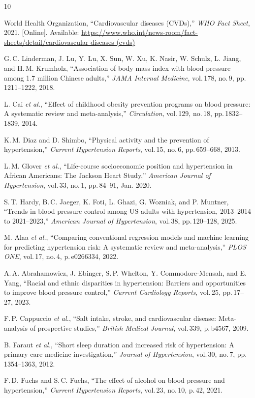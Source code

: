﻿\documentclass[conference]{IEEEtran}
\begin{document}
\begin{thebibliography}{10}

World Health Organization, ``Cardiovascular diseases (CVDs),'' \textit{WHO Fact Sheet}, 2021. [Online]. Available: \url{https://www.who.int/news-room/fact-sheets/detail/cardiovascular-diseases-(cvds)}

G.\,C. Linderman, J. Lu, Y. Lu, X. Sun, W. Xu, K. Nasir, W. Schulz, L. Jiang, and H.\,M. Krumholz, ``Association of body mass index with blood pressure among 1.7 million Chinese adults,'' \textit{JAMA Internal Medicine}, vol.\,178, no.\,9, pp.\,1211--1222, 2018.

L. Cai \textit{et al.}, ``Effect of childhood obesity prevention programs on blood pressure: A systematic review and meta-analysis,'' \textit{Circulation}, vol.\,129, no.\,18, pp.\,1832--1839, 2014.

K.\,M. Diaz and D. Shimbo, ``Physical activity and the prevention of hypertension,'' \textit{Current Hypertension Reports}, vol.\,15, no.\,6, pp.\,659--668, 2013.

L.\,M. Glover \textit{et al.}, ``Life-course socioeconomic position and hypertension in African Americans: The Jackson Heart Study,'' \textit{American Journal of Hypertension}, vol.\,33, no.\,1, pp.\,84--91, Jan. 2020.

S.\,T. Hardy, B.\,C. Jaeger, K. Foti, L. Ghazi, G. Wozniak, and P. Muntner, ``Trends in blood pressure control among US adults with hypertension, 2013--2014 to 2021--2023,'' \textit{American Journal of Hypertension}, vol.\,38, pp.\,120--128, 2025.

M. Alaa \textit{et al.}, ``Comparing conventional regression models and machine learning for predicting hypertension risk: A systematic review and meta-analysis,'' \textit{PLOS ONE}, vol.\,17, no.\,4, p.\,e0266334, 2022.

A.\,A. Abrahamowicz, J. Ebinger, S.\,P. Whelton, Y. Commodore-Mensah, and E. Yang, ``Racial and ethnic disparities in hypertension: Barriers and opportunities to improve blood pressure control,'' \textit{Current Cardiology Reports}, vol.\,25, pp.\,17--27, 2023.

F.\,P. Cappuccio \textit{et al.}, ``Salt intake, stroke, and cardiovascular disease: Meta-analysis of prospective studies,'' \textit{British Medical Journal}, vol.\,339, p.\,b4567, 2009.

B. Faraut \textit{et al.}, ``Short sleep duration and increased risk of hypertension: A primary care medicine investigation,'' \textit{Journal of Hypertension}, vol.\,30, no.\,7, pp.\,1354--1363, 2012.

F.\,D. Fuchs and S.\,C. Fuchs, ``The effect of alcohol on blood pressure and hypertension,'' \textit{Current Hypertension Reports}, vol.\,23, no.\,10, p.\,42, 2021.

\end{thebibliography}
\end{document}
